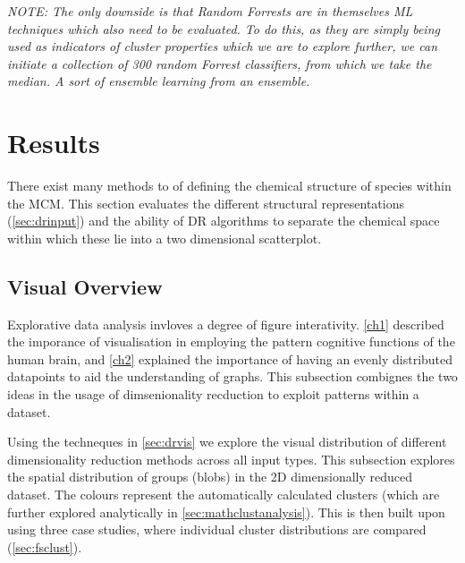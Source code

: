 %

\textit{NOTE: The only downside is that Random Forrests are in themselves ML techniques which also need to be evaluated. To do this, as they are simply being used as indicators of cluster properties which we are to explore further, we can initiate a collection of 300 random Forrest classifiers, from which we take the median. A sort of ensemble learning from an ensemble. }


\section{Results}\label{sec:drres}
%
There exist many methods to of defining the chemical structure of species within the MCM. This section evaluates the different structural representations (\autoref{sec:drinput}) and the ability of DR algorithms to separate the chemical space within which these lie into a two dimensional scatterplot.

%

\subsection{Visual Overview}\label{sec:cldist}

Explorative data analysis invloves a degree of figure interativity. \autoref{ch1} described the imporance of visualisation in employing the pattern cognitive functions of the human brain, and \autoref{ch2} explained the importance of having an evenly distributed datapoints to aid the understanding of graphs. This subsection combignes the two ideas in the usage of dimsenionality recduction to exploit patterns within a dataset.

Using the techneques in \autoref{sec:drvis} we explore the visual distribution of different dimensionality reduction methods across all input types. This subsection explores the spatial distribution of groups (blobs) in the 2D dimensionally reduced dataset. The colours represent the automatically calculated clusters (which are further explored analytically in \autoref{sec:mathclustanalysis}).
This is then built upon using three case studies, where individual cluster distributions are compared (\autoref{sec:fsclust}).


